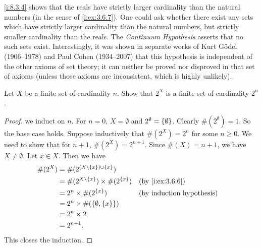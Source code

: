 \setcounter{thm}{5}
\begin{rmk}\label{i:8.3.6}
  \cref{i:8.3.4} shows that the reals have strictly larger cardinality than the natural numbers (in the sense of \cref{i:ex:3.6.7}).
  One could ask whether there exist any sets which have strictly larger cardinality than the natural numbers, but strictly smaller cardinality than the reals.
  The \emph{Continuum Hypothesis} asserts that no such sets exist.
  Interestingly, it was shown in separate works of Kurt Gödel (1906--1978) and Paul Cohen (1934--2007) that this hypothesis is independent of the other axioms of set theory;
  it can neither be proved nor disproved in that set of axioms
  (unless those axioms are inconsistent, which is highly unlikely).
\end{rmk}

\exercisesection

\begin{ex}\label{i:ex:8.3.1}
  Let \(X\) be a finite set of cardinality \(n\).
  Show that \(2^X\) is a finite set of cardinality \(2^n\).
\end{ex}

\begin{proof}
  we induct on \(n\).
  For \(n = 0\), \(X = \emptyset\) and \(2^{\emptyset} = \left\lbrace\emptyset\right\rbrace\).
  Clearly \(\#(2^{\emptyset}) = 1\).
  So the base case holds.
  Suppose inductively that \(\#(2^X) = 2^n\) for some \(n \geq 0\).
  We need to show that for \(n + 1\), \(\#(2^X) = 2^{n + 1}\).
  Since \(\#(X) = n + 1\), we have \(X \neq \emptyset\).
  Let \(x \in X\).
  Then we have
  \begin{align*}
    \#(2^X) & = \#(2^{(X \setminus \set{x}) \cup \set{x}})                              \\
            & = \#(2^{X \setminus \set{x}}) \times \#(2^{\set{x}}) &  & \by{i:ex:3.6.6} \\
            & = 2^n \times \#(2^{\set{x}})                         &  & \byIH           \\
            & = 2^n \times \#(\set{\emptyset, \set{x}})                                 \\
            & = 2^n \times 2                                                            \\
            & = 2^{n + 1}.
  \end{align*}
  This closes the induction.
\end{proof}

